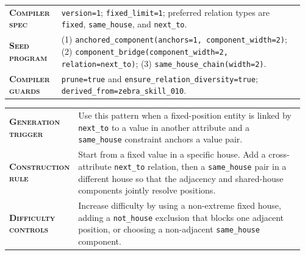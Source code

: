 \begin{table}[htbp]
\centering
\begin{minipage}{0.97\textwidth}
\raggedright
\small
\setlength{\tabcolsep}{3pt}
\renewcommand{\arraystretch}{1.16}
\vspace{0.35em}
\begin{tabular}{@{}>{\raggedright\arraybackslash\bfseries}p{0.17\linewidth} >{\raggedright\arraybackslash}p{0.79\linewidth}@{}}
    \textsc{Compiler spec} & \texttt{version=1}; \texttt{fixed\_limit=1}; preferred relation types are \texttt{fixed}, \texttt{same\_house}, and \texttt{next\_to}. \\
    \textsc{Seed program} & (1) \texttt{anchored\_component(anchors=1, component\_width=2)}; (2) \texttt{component\_bridge(component\_width=2, relation=next\_to)}; (3) \texttt{same\_house\_chain(width=2)}. \\
    \textsc{Compiler guards} & \texttt{prune=true} and \texttt{ensure\_relation\_diversity=true}; \texttt{derived\_from=zebra\_skill\_010}. \\
\end{tabular}
\vspace{0.45em}
\end{minipage}
\end{table}

\begin{table}[htbp]
\centering
\begin{minipage}{0.97\textwidth}
\raggedright
\small
\setlength{\tabcolsep}{3pt}
\renewcommand{\arraystretch}{1.16}
\vspace{0.35em}
\begin{tabular}{@{}>{\raggedright\arraybackslash\bfseries}p{0.17\linewidth} >{\raggedright\arraybackslash}p{0.79\linewidth}@{}}
    \textsc{Generation trigger} & Use this pattern when a fixed-position entity is linked by \texttt{next\_to} to a value in another attribute and a \texttt{same\_house} constraint anchors a value pair. \\
    \textsc{Construction rule} & Start from a fixed value in a specific house. Add a cross-attribute \texttt{next\_to} relation, then a \texttt{same\_house} pair in a different house so that the adjacency and shared-house components jointly resolve positions. \\
    \textsc{Difficulty controls} & Increase difficulty by using a non-extreme fixed house, adding a \texttt{not\_house} exclusion that blocks one adjacent position, or choosing a non-adjacent \texttt{same\_house} component. \\
\end{tabular}
\vspace{0.45em}
\end{minipage}
\end{table}

